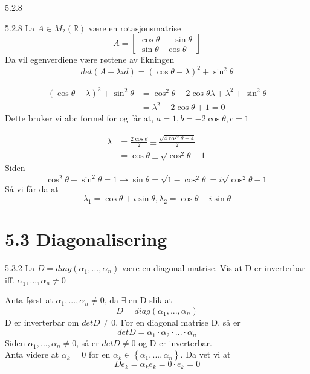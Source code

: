 \documentclass[a4paper,norsk]{article}
\begin{document}
\begin{oppgavebox}{5.2.8}{}
\begin{proofbox}{5.2.8}{}
La $ A \in M_2 (\mathbb{R}) $ være en rotasjonsmatrise
\[
    A = \begin{bmatrix}
        \cos\theta&-\sin\theta \\
        \sin\theta& \cos\theta
    \end{bmatrix} 
\]
Da vil egenverdiene være røttene av likningen 
\[
    det \left( A - \lambda id \right) = \left( \cos\theta - \lambda \right) ^2 + \sin^2\theta
\]

\begin{align*}
\left( \cos\theta - \lambda \right) ^2 + \sin^2\theta &= \cos^2\theta - 2\cos\theta \lambda + \lambda^2 + \sin^2 \theta \\
&= \lambda^2 -2\cos\theta +1=0
\end{align*}
Dette bruker vi abc formel for og får at, $ a=1, b=-2\cos\theta, c=1 $

\begin{align*}
    \lambda &= \frac{ 2\cos\theta }{ 2 } \pm \frac{ \sqrt{ 4 \cos^2\theta -4 } }{ 2 }\\
    &= \cos\theta \pm \sqrt{ \cos^2\theta -1 }
\end{align*}
Siden 
\[
    \cos^2\theta + \sin^2\theta = 1 \rightarrow \sin\theta = \sqrt{ 1- \cos^2\theta } = i \sqrt{ \cos^2\theta - 1 }
\]
Så vi får da at 
\[
    \lambda_1 = \cos\theta + i \sin\theta, \lambda_2 = \cos\theta - i \sin\theta
\]
\end{proofbox}
\end{oppgavebox}

\section*{5.3 Diagonalisering}


\begin{oppgavebox}{5.3.2}{}
La $ D = diag \left(  \alpha_{1}^{}, ..., \alpha_{n}^{}   \right)  $ være en diagonal matrise. Vis at D er inverterbar iff. $ \alpha_{1}^{} , ..., \alpha_{n}^{} \neq 0  $

\begin{proofbox}{}
Anta først at $ \alpha_{1}^{} , ..., \alpha_{n}^{} \neq 0 $, da $ \exists $  en D slik at 
\[
    D = diag \left( \alpha_{1}^{} , ..., \alpha_{n}^{} \right) 
\]
D er inverterbar om $ det D \neq 0 $. For en diagonal matrise D, så er 
\[
    det D = \alpha_{1}^{} \cdot \alpha_{2}^{} \cdot ... \cdot \alpha_{n}^{} 
\]
Siden $ \alpha_{1}^{} , ..., \alpha_{n}^{} \neq 0 $, så er $ det D \neq 0 $ og D er inverterbar.\\


Anta videre at $ \alpha_{k}^{}  = 0 $ for en $ \alpha_{k}^{} \in \left\{ \alpha_{1}^{} , ..., \alpha_{n}^{} \right\}  $. Da vet vi at 
\[
    D e_k = \alpha_{k}^{} e_k = 0 \cdot e_k = 0
\]
\end{proofbox}
\end{oppgavebox}
\end{document}
